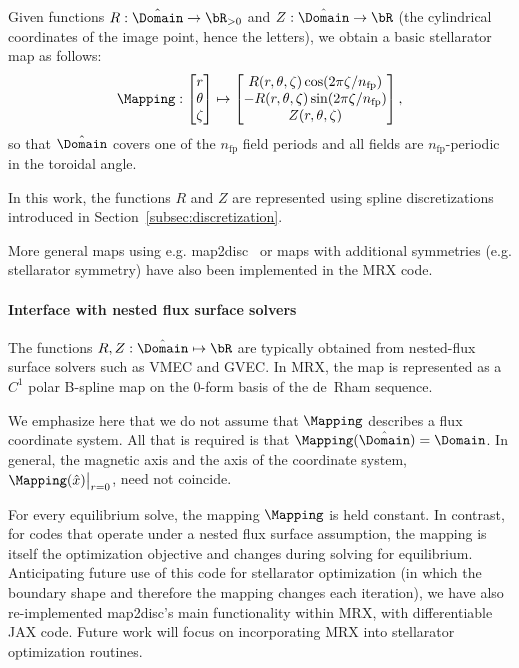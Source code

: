 \documentclass[%
 reprint,
 superscriptaddress,
 amsmath,amssymb,
 aps, nofootinbib, floatfix]{revtex4-2}
\begin{document}
Given functions $R: \hat \Domain \to \bR_{ > 0}$ and $Z: \hat \Domain \to \bR$ (the cylindrical coordinates of the image point, hence the letters), we obtain a basic stellarator map as follows:
\begin{align}
    \label{eq:stellarator_map}
    \Mapping:
    \begin{bmatrix} r \\ \theta \\ \zeta \end{bmatrix} \mapsto
    \begin{bmatrix}
        R(r, \theta, \zeta) \cos(2\pi \zeta / n_{\mathrm{fp}}) \\
        - R(r, \theta, \zeta) \sin(2\pi \zeta / n_{\mathrm{fp}}) \\
        Z(r, \theta, \zeta)
    \end{bmatrix},
\end{align}
so that $\hat \Domain$ covers one of the $n_{\mathrm{fp}}$ field periods and all fields are $n_{\mathrm{fp}}$-periodic in the toroidal angle.   

In this work, the functions $R$ and $Z$ are represented using spline discretizations introduced in Section~\ref{subsec:discretization}.

\begin{remark}
    More general maps using e.g. map2disc~\cite{babin2025construction} or maps with additional symmetries (e.g. stellarator symmetry) have also been implemented in the MRX code.
\end{remark}

\paragraph{Interface with nested flux surface solvers}
The functions $R, Z : \hat \Domain \mapsto \bR$ are typically obtained from nested-flux surface solvers such as VMEC and {GVEC}. In MRX, the map is represented as a $C^1$ polar B-spline map on the $0$-form basis of the de~Rham sequence.

We emphasize here that we do not assume that $\Mapping$ describes a flux coordinate system. All that is required is that $\Mapping(\hat \Domain) = \Domain$. In general, the magnetic axis and the axis of the coordinate system, $\Mapping(\hat x) \big |_{r = 0}$, need not coincide. 

For every equilibrium solve, the mapping $\Mapping$ is held constant. In contrast, for codes that operate under a nested flux surface assumption, the mapping is itself the optimization objective and changes during solving for equilibrium. Anticipating future use of this code for stellarator optimization (in which the boundary shape and therefore the mapping changes each iteration), we have also re-implemented map2disc's main functionality within MRX, with differentiable JAX code. Future work will focus on incorporating MRX into stellarator optimization routines. 
\end{document}
